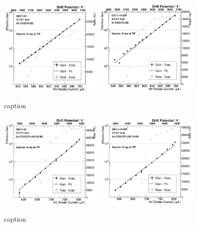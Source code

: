 \begin{figure}[htbp]
    \centering
    \includegraphics[width=0.45\textwidth]{figures/GEM/Gain_curve_GE11_IV_Ar_CO2.jpeg}%
    \includegraphics[width=0.45\textwidth]{figures/GEM/Gain_curve_GE11_IV_GIF_Ar_CO2.jpeg}
    \caption{caption}
    \label{fig:gain_GE1/1_IV}
\end{figure}
\begin{figure}[htbp]
    \centering
    \includegraphics[width=0.45\textwidth]{figures/GEM/Gain_curve_GE11_IV_Ar_CO2_CF4.jpeg}%
    \includegraphics[width=0.45\textwidth]{figures/GEM/Gain_curve_GE11_IV_GIF_Ar_CO2_CF4.jpeg}
    \caption{caption}
    \label{fig:gain_GE1/1_IV_GIF}
\end{figure}
